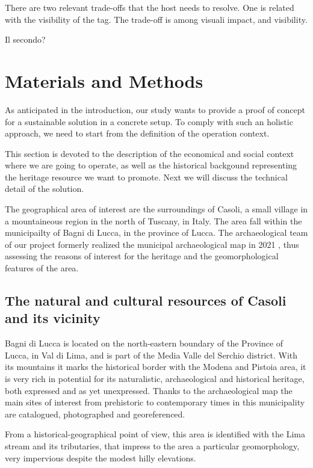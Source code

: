\documentclass[sustainability,article,submit,pdftex,moreauthors]{Definitions/mdpi}
\begin{document}
There are two relevant trade-offs that the host needs to resolve. One is related with the visibility of the tag. The trade-off is among visuali impact, and visibility.

Il secondo?

\section{Materials and Methods}

As anticipated in the introduction, our study wants to provide a proof of concept for a sustainable solution in a concrete setup. To comply with such an holistic approach, we need to start from the definition of the operation context.

This section is devoted to the description of the economical and social context where we are going to operate, as well as the historical backgound representing the heritage resource we want to promote. Next we will discuss the technical detail of the solution.

The geographical area of interest are the surroundings of Casoli, a small village in a mountaineous region in the north of Tuscany, in Italy. The area fall within the municipailty of Bagni di Lucca, in the province of Lucca. The archaeological team of our project formerly realized the municipal archaeological map in 2021 \cite{letizia2021}, thus assessing the reasons of interest for the heritage and the geomorphological features of the area.

\subsection{The natural and cultural resources of Casoli and its vicinity}

Bagni di Lucca is located on the north-eastern boundary of the Province of Lucca, in Val di Lima, and is part of the Media Valle del Serchio district. With its mountains it marks the historical border with the Modena and Pistoia area, it is very rich in potential for its naturalistic, archaeological and historical heritage, both expressed and as yet unexpressed. Thanks to the archaeological map the main sites of interest from prehistoric to contemporary times in this municipality are catalogued, photographed and georeferenced.

From a historical-geographical point of view, this area is identified with the Lima stream and its tributaries, that impress to the area a particular geomorphology, very impervious despite the modest hilly elevations.
\end{document}
